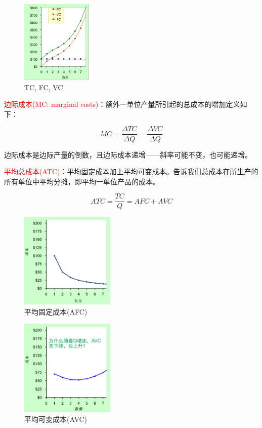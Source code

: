 \documentclass[12pt, a4paper]{article}
\begin{document}
\begin{figure}[H]
  \centering
  \includegraphics[width=0.3\textwidth]{成本函数.png}
  \caption{TC, FC, VC}
\end{figure}

\textcolor{red}{边际成本(MC: marginal costs)}：额外一单位产量所引起的总成本的增加定义如下：

\[ MC = \frac{\Delta TC}{\Delta Q} = \frac{\Delta VC}{\Delta Q} \]

边际成本是边际产量的倒数，且边际成本递增——斜率可能不变，也可能递增。

\textcolor{red}{平均总成本(ATC)}：平均固定成本加上平均可变成本。告诉我们总成本在所生产的所有单位中平均分摊，即平均一单位产品的成本。

\[ ATC = \frac{TC}{Q} = AFC + AVC \]

\begin{figure}[H]
  \centering
  \includegraphics[width=0.4\textwidth]{AFC.png}
  \caption{平均固定成本(AFC)}
\end{figure}

\begin{figure}[H]
  \centering
  \includegraphics[width=0.4\textwidth]{AVC.png}
  \caption{平均可变成本(AVC)}
\end{figure}
\end{document}

